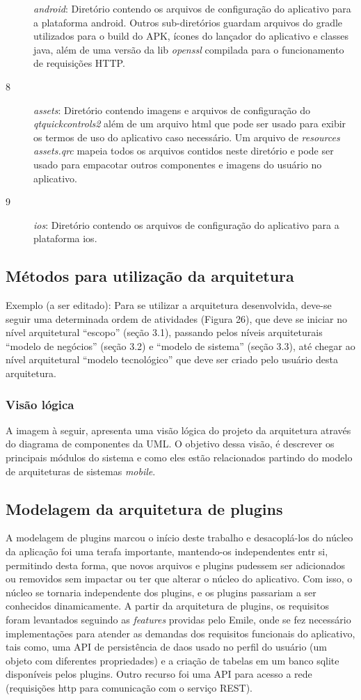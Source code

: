 \begin{description}
	\itrem[7] \textit{android}: Diretório contendo os arquivos de configuração do aplicativo para a plataforma android. Outros sub-diretórios guardam arquivos do gradle utilizados para o build do APK, ícones do lançador do aplicativo e classes java, além de uma versão da lib \textit{openssl} compilada para o funcionamento de requisições HTTP.
	\item[8] \textit{assets}: Diretório contendo imagens e arquivos de configuração do \textit{qtquickcontrols2} além de um arquivo html que pode ser usado para exibir os termos de uso do aplicativo caso necessário. Um arquivo de \textit{resources} \textit{assets.qrc} mapeia todos os arquivos contidos neste diretório e pode ser usado para empacotar outros componentes e imagens do usuário no aplicativo.
	\item[9] \textit{ios}: Diretório contendo os arquivos de configuração do aplicativo para a plataforma ios. 
\end{description}

\subsection{Métodos para utilização da arquitetura}
Exemplo (a ser editado): Para se utilizar a arquitetura desenvolvida, deve-se seguir uma determinada ordem de atividades (Figura 26), que deve se iniciar no nível arquitetural “escopo” (seção 3.1), passando pelos níveis arquiteturais “modelo de negócios” (seção 3.2) e “modelo de sistema” (seção 3.3), até chegar ao nível arquitetural “modelo tecnológico” que deve ser criado pelo usuário desta arquitetura.


\subsubsection{Visão lógica}
A imagem à seguir, apresenta uma visão lógica do projeto da arquitetura através do diagrama de componentes da UML. O objetivo dessa visão, é descrever os principais módulos do sistema e como eles estão relacionados partindo do modelo de arquiteturas de sistemas \textit{mobile}.


\subsection{Modelagem da arquitetura de plugins}
A modelagem de plugins marcou o início deste trabalho e desacoplá-los do núcleo da aplicação foi uma terafa importante, mantendo-os independentes entr si, permitindo desta forma, que novos arquivos e plugins pudessem ser adicionados ou removidos sem impactar ou ter que alterar o núcleo do aplicativo. Com isso, o núcleo se tornaria independente dos plugins, e os plugins passariam a ser conhecidos dinamicamente. A partir da arquitetura de plugins, os requisitos foram levantados seguindo as \textit{features} providas pelo Emile, onde se fez necessário implementações para atender as demandas dos requisitos funcionais do aplicativo, tais como, uma API de persistência de daos usado no perfil do usuário (um objeto com diferentes propriedades) e a criação de tabelas em um banco sqlite disponíveis pelos plugins. Outro recurso foi uma API para acesso a rede (requisições http para comunicação com o serviço REST). 

